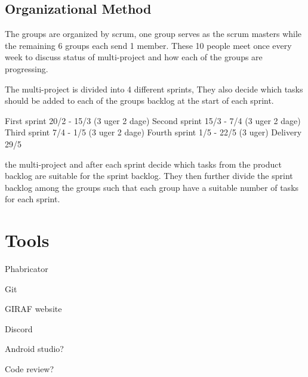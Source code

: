 % 
% 
% 








\subsection{Organizational Method}

The groups are organized by scrum, one group serves as the scrum masters while
the remaining 6 groups each send 1 member. These 10 people meet once every week
to discuss status of multi-project and how each of the groups are progressing.


The multi-project is divided into 4 different sprints,
They also decide which tasks should be added to each of the groups backlog at
the start of each sprint.


First sprint 20/2 - 15/3 	(3 uger 2 dage)
Second sprint 15/3 - 7/4 	(3 uger 2 dage)
Third sprint 7/4 - 1/5		(3 uger 2 dage)
Fourth sprint 1/5 - 22/5 	(3 uger)
Delivery 29/5


the
multi-project and after each sprint decide which tasks from the product backlog are suitable
for the sprint backlog. They then further divide the sprint backlog among the
groups such that each group have a suitable number of tasks for each sprint.\nl


\section{Tools}

Phabricator

Git

GIRAF website

Discord

Android studio?

Code review?
